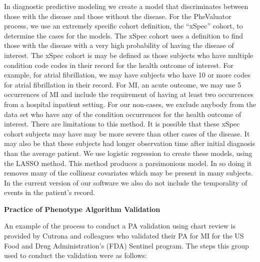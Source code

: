 \documentclass[11pt]{book}
\theoremstyle{definition}
\theoremstyle{definition}
\theoremstyle{definition}
\theoremstyle{remark}
\begin{document}
\begin{enumerate}
  In diagnostic predictive modeling we create a model that discriminates between those with the disease and those without the disease. For the PheValuator process, we use an extremely specific cohort definition, the ``xSpec'' cohort, to determine the cases for the models. The xSpec cohort uses a definition to find those with the disease with a very high probability of having the disease of interest. The xSpec cohort is may be defined as those subjects who have multiple condition code codes in their record for the health outcome of interest. For example, for atrial fibrillation, we may have subjects who have 10 or more codes for atrial fibrillation in their record. For MI, an acute outcome, we may use 5 occurrences of MI and include the requirement of having at least two occurrences from a hospital inpatient setting. For our non-cases, we exclude anybody from the data set who have any of the condition occurrences for the health outcome of interest. There are limitations to this method. It is possible that these xSpec cohort subjects may have may be more severe than other cases of the disease. It may also be that these subjects had longer observation time after initial diagnosis than the average patient. We use logistic regression to create these models, using the LASSO method.\citep{tibshirani_regression_1996} This method produces a parsimonious model. In so doing it removes many of the collinear covariates which may be present in many subjects. In the current version of our software we also do not include the temporality of events in the patient's record.
\end{enumerate}

\textbf{Practice of Phenotype Algorithm Validation}

An example of the process to conduct a PA validation using chart review is provided by Cutrona and colleagues who validated their PA for MI for the US Food and Drug Administration's (FDA) Sentinel program.\citep{cutrona_validation_2013} The steps this group used to conduct the validation were as follows: 
\end{document}
